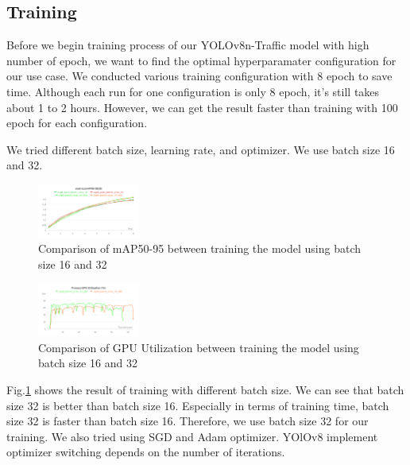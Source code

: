 \documentclass[conference]{IEEEtran}
\begin{document}
\subsection{Training}
Before we begin training process of our YOLOv8n-Traffic model with high number of epoch, we want to find the optimal hyperparamater configuration for our use case. We conducted various training configuration with 8 epoch to save time.
Although each run for one configuration is only 8 epoch, it's still takes about 1 to 2 hours. However, we can get the result faster than training with 100 epoch for each configuration.

We tried different batch size, learning rate, and optimizer. We use batch size 16 and 32.
\begin{figure}[h]
\centering
\includegraphics[width=0.3\textwidth,keepaspectratio]{mAP_batch_size_comparison.png} %
\caption{Comparison of mAP50-95 between training the model using batch size 16 and 32}
\label{fig:batch_size}
\end{figure}

\begin{figure}[h!]
\centering
\includegraphics[width=0.3\textwidth,keepaspectratio]{gpu_utilization_comparison.png} 
\caption{Comparison of GPU Utilization between training the model using batch size 16 and 32}
\label{fig:gpu_utilization}
\end{figure}
Fig.\ref{fig:batch_size} shows the result of training with different batch size. We can see that batch size 32 is better than batch size 16. Especially in terms of training time, batch size 32 is faster than batch size 16.
Therefore, we use batch size 32 for our training. We also tried using SGD and Adam optimizer. YOlOv8 implement optimizer switching depends on the number of iterations.
\end{document}
